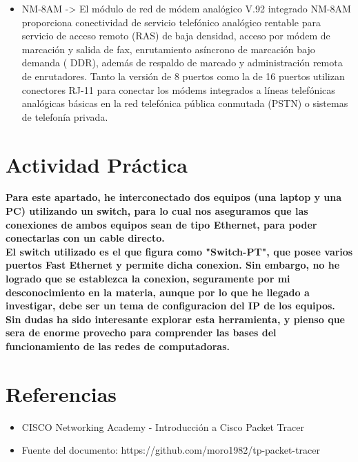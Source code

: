 \documentclass{article}
\begin{document}
\begin{itemize}
    \item NM-8AM -> El módulo de red de módem analógico V.92 integrado NM-8AM proporciona conectividad de servicio telefónico analógico rentable para servicio de acceso remoto (RAS) de baja densidad, acceso por módem de marcación y salida de fax, enrutamiento asíncrono de marcación bajo demanda ( DDR), además de respaldo de marcado y administración remota de enrutadores. Tanto la versión de 8 puertos como la de 16 puertos utilizan conectores RJ-11 para conectar los módems integrados a líneas telefónicas analógicas básicas en la red telefónica pública conmutada (PSTN) o sistemas de telefonía privada.
\end{itemize}

\newpage
\section{Actividad Práctica}
\textbf{ Para este apartado, he interconectado dos equipos (una laptop y una PC) utilizando un switch, para lo cual nos aseguramos que las conexiones de ambos equipos sean de tipo Ethernet, para poder conectarlas con un cable directo. } \\

\textbf{ El switch utilizado es el que figura como "Switch-PT", que posee varios puertos Fast Ethernet y permite dicha conexion.
Sin embargo, no he logrado que se establezca la conexion, seguramente por mi desconocimiento en la materia, aunque por lo que he llegado a investigar, debe ser un tema de configuracion del IP de los equipos. } \\

\textbf{Sin dudas ha sido interesante explorar esta herramienta, y pienso que sera de enorme provecho para comprender las bases del funcionamiento de las redes de computadoras.}

\newpage
\section{Referencias}
\begin{itemize}
    \item CISCO Networking Academy - Introducción a Cisco Packet Tracer
    \item Fuente del documento: https://github.com/moro1982/tp-packet-tracer
\end{itemize}
\end{document}
